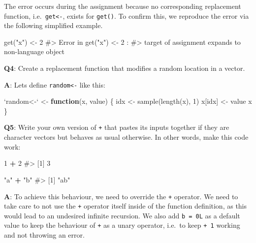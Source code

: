 \documentclass[
]{krantz}
\makeatletter
\newenvironment{Shaded}{\begin{snugshade}}{\end{snugshade}}
\newcommand{\CommentTok}[1]{\textcolor[rgb]{0.56,0.35,0.01}{\textit{#1}}}
\newcommand{\ControlFlowTok}[1]{\textcolor[rgb]{0.13,0.29,0.53}{\textbf{#1}}}
\newcommand{\DataTypeTok}[1]{\textcolor[rgb]{0.13,0.29,0.53}{#1}}
\newcommand{\DecValTok}[1]{\textcolor[rgb]{0.00,0.00,0.81}{#1}}
\newcommand{\KeywordTok}[1]{\textcolor[rgb]{0.13,0.29,0.53}{\textbf{#1}}}
\newcommand{\NormalTok}[1]{#1}
\newcommand{\OperatorTok}[1]{\textcolor[rgb]{0.81,0.36,0.00}{\textbf{#1}}}
\newcommand{\StringTok}[1]{\textcolor[rgb]{0.31,0.60,0.02}{#1}}
\newenvironment{kframe}{%
\medskip{}
\setlength{\fboxsep}{.8em}
 \def\at@end@of@kframe{}%
 \ifinner\ifhmode%
  \def\at@end@of@kframe{\end{minipage}}%
  \begin{minipage}{\columnwidth}%
 \fi\fi%
 \def\FrameCommand##1{\hskip\@totalleftmargin \hskip-\fboxsep
 \colorbox{shadecolor}{##1}\hskip-\fboxsep
     \hskip-\linewidth \hskip-\@totalleftmargin \hskip\columnwidth}%
 \MakeFramed {\advance\hsize-\width
   \@totalleftmargin\z@ \linewidth\hsize
   \@setminipage}}%
 {\par\unskip\endMakeFramed%
 \at@end@of@kframe}
\renewenvironment{Shaded}{\begin{kframe}}{\end{kframe}}
\renewcommand{\KeywordTok} [1]{\textcolor[rgb]{0.00,0.44,0.13}{{#1}}}
\renewcommand{\DataTypeTok}[1]{\textcolor[rgb]{0.56,0.13,0.00}{{#1}}}
\renewcommand{\DecValTok}  [1]{\textcolor[rgb]{0.25,0.63,0.44}{{#1}}}
\renewcommand{\StringTok}  [1]{\textcolor[rgb]{0.25,0.44,0.63}{{#1}}}
\renewcommand{\CommentTok} [1]{\textcolor[rgb]{0.38,0.63,0.69}{{#1}}}
\renewcommand{\NormalTok}  [1]{{#1}}
\makeatother
\begin{document}
The error occurs during the assignment because no corresponding replacement function, i.e.~\texttt{get\textless{}-}, exists for \texttt{get()}. To confirm this, we reproduce the error via the following simplified example.

\begin{Shaded}
\begin{Highlighting}[]
\KeywordTok{get}\NormalTok{(}\StringTok{"x"}\NormalTok{) <-}\StringTok{ }\DecValTok{2}
\CommentTok{#> Error in get("x") <- 2 :}
\CommentTok{#>   target of assignment expands to non-language object}
\end{Highlighting}
\end{Shaded}

\textbf{{Q4}}: Create a replacement function that modifies a random location in a vector.

\textbf{{A}}: Lets define \texttt{random\textless{}-} like this:

\begin{Shaded}
\begin{Highlighting}[]
\StringTok{`}\DataTypeTok{random<-}\StringTok{`}\NormalTok{ <-}\StringTok{ }\ControlFlowTok{function}\NormalTok{(x, value) \{}
\NormalTok{  idx <-}\StringTok{ }\KeywordTok{sample}\NormalTok{(}\KeywordTok{length}\NormalTok{(x), }\DecValTok{1}\NormalTok{)}
\NormalTok{  x[idx] <-}\StringTok{ }\NormalTok{value}
\NormalTok{  x}
\NormalTok{\}}
\end{Highlighting}
\end{Shaded}

\textbf{{Q5}}: Write your own version of \texttt{+} that pastes its inputs together if they are character vectors but behaves as usual otherwise. In other words, make this code work:

\begin{Shaded}
\begin{Highlighting}[]
\DecValTok{1} \OperatorTok{+}\StringTok{ }\DecValTok{2}
\CommentTok{#> [1] 3}

\StringTok{"a"} \OperatorTok{+}\StringTok{ "b"}
\CommentTok{#> [1] "ab"}
\end{Highlighting}
\end{Shaded}

\textbf{{A}}: To achieve this behaviour, we need to override the \texttt{+} operator. We need to take care to not use the \texttt{+} operator itself inside of the function definition, as this would lead to an undesired infinite recursion. We also add \texttt{b\ =\ 0L} as a default value to keep the behaviour of \texttt{+} as a unary operator, i.e.~to keep \texttt{+\ 1} working and not throwing an error.
\end{document}
